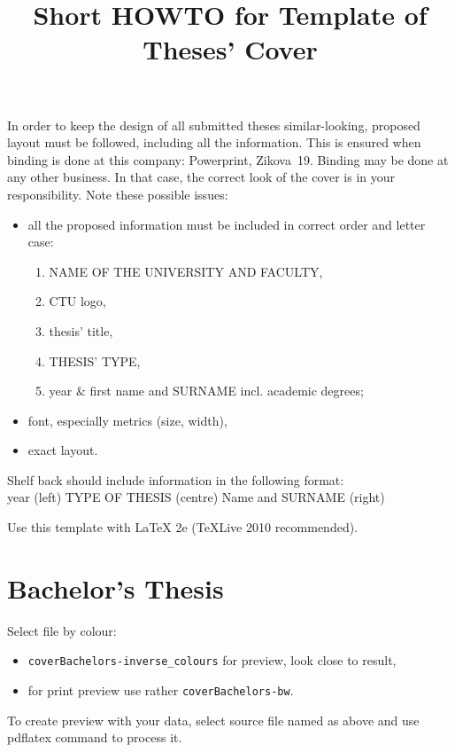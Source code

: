 \documentclass[a4paper]{article}
\title{Short HOWTO for Template of Theses' Cover}
\author{}
\date{}
\begin{document}
\maketitle

\thispagestyle{empty}

In order to keep the design of all submitted theses similar-looking, proposed layout must be followed, including all the information. This is ensured when binding is done at this company: Powerprint, Zikova~19. Binding may be done at any other business. In that case, the correct look of the cover is in your responsibility. Note these possible issues:

\begin{itemize}
	\item all the proposed information must be included in correct order and letter case:
	\begin{enumerate}
		\item NAME OF THE UNIVERSITY AND FACULTY,
		\item CTU logo,
		\item thesis' title,
		\item THESIS' TYPE,
		\item year \& first name and SURNAME incl. academic degrees;
	\end{enumerate}
	\item font, especially metrics (size, width),
	\item exact layout.
\end{itemize}

Shelf back should include information in the following format:\\
year (left) \hfill TYPE OF THESIS (centre) \hfill Name and SURNAME (right)

Use this template with \LaTeX{} 2e (TeXLive 2010 recommended).

\section{Bachelor's Thesis}

Select file by colour:
\begin{itemize}
	\item \verb|coverBachelors-inverse_colours| for preview, look close to result,
	\item for print preview use rather \verb|coverBachelors-bw|.
\end{itemize}

To create preview with your data, select source file named as above and use pdflatex command to process it.
\end{document}
